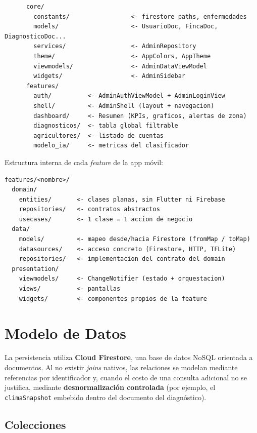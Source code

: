 \documentclass[12pt,a4paper]{article}
\begin{document}
{\begin{verbatim}
      core/
        constants/                 <- firestore_paths, enfermedades
        models/                    <- UsuarioDoc, FincaDoc, DiagnosticoDoc...
        services/                  <- AdminRepository
        theme/                     <- AppColors, AppTheme
        viewmodels/                <- AdminDataViewModel
        widgets/                   <- AdminSidebar
      features/
        auth/          <- AdminAuthViewModel + AdminLoginView
        shell/         <- AdminShell (layout + navegacion)
        dashboard/     <- Resumen (KPIs, graficos, alertas de zona)
        diagnosticos/  <- tabla global filtrable
        agricultores/  <- listado de cuentas
        modelo_ia/     <- metricas del clasificador
\end{verbatim}
}

Estructura interna de cada \textit{feature} de la app móvil:

{\small
\begin{verbatim}
features/<nombre>/
  domain/
    entities/       <- clases planas, sin Flutter ni Firebase
    repositories/   <- contratos abstractos
    usecases/       <- 1 clase = 1 accion de negocio
  data/
    models/         <- mapeo desde/hacia Firestore (fromMap / toMap)
    datasources/    <- acceso concreto (Firestore, HTTP, TFLite)
    repositories/   <- implementacion del contrato del domain
  presentation/
    viewmodels/     <- ChangeNotifier (estado + orquestacion)
    views/          <- pantallas
    widgets/        <- componentes propios de la feature
\end{verbatim}
}

\section{Modelo de Datos}

La persistencia utiliza \textbf{Cloud Firestore}, una base de datos NoSQL
orientada a documentos. Al no existir \textit{joins} nativos, las relaciones se
modelan mediante referencias por identificador y, cuando el costo de una consulta
adicional no se justifica, mediante \textbf{desnormalización controlada} (por
ejemplo, el \texttt{climaSnapshot} embebido dentro del documento del
diagnóstico).

\subsection{Colecciones}
\end{document}
